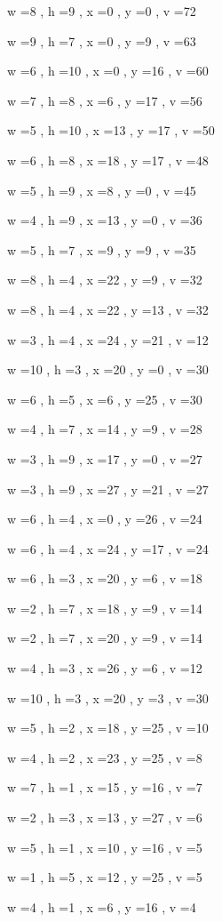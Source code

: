 \documentclass[11pt]{article}
\begin{document}
w =8 , h =9 , x =0 , y =0 , v =72
\par
w =9 , h =7 , x =0 , y =9 , v =63
\par
w =6 , h =10 , x =0 , y =16 , v =60
\par
w =7 , h =8 , x =6 , y =17 , v =56
\par
w =5 , h =10 , x =13 , y =17 , v =50
\par
w =6 , h =8 , x =18 , y =17 , v =48
\par
w =5 , h =9 , x =8 , y =0 , v =45
\par
w =4 , h =9 , x =13 , y =0 , v =36
\par
w =5 , h =7 , x =9 , y =9 , v =35
\par
w =8 , h =4 , x =22 , y =9 , v =32
\par
w =8 , h =4 , x =22 , y =13 , v =32
\par
w =3 , h =4 , x =24 , y =21 , v =12
\par
w =10 , h =3 , x =20 , y =0 , v =30
\par
w =6 , h =5 , x =6 , y =25 , v =30
\par
w =4 , h =7 , x =14 , y =9 , v =28
\par
w =3 , h =9 , x =17 , y =0 , v =27
\par
w =3 , h =9 , x =27 , y =21 , v =27
\par
w =6 , h =4 , x =0 , y =26 , v =24
\par
w =6 , h =4 , x =24 , y =17 , v =24
\par
w =6 , h =3 , x =20 , y =6 , v =18
\par
w =2 , h =7 , x =18 , y =9 , v =14
\par
w =2 , h =7 , x =20 , y =9 , v =14
\par
w =4 , h =3 , x =26 , y =6 , v =12
\par
w =10 , h =3 , x =20 , y =3 , v =30
\par
w =5 , h =2 , x =18 , y =25 , v =10
\par
w =4 , h =2 , x =23 , y =25 , v =8
\par
w =7 , h =1 , x =15 , y =16 , v =7
\par
w =2 , h =3 , x =13 , y =27 , v =6
\par
w =5 , h =1 , x =10 , y =16 , v =5
\par
w =1 , h =5 , x =12 , y =25 , v =5
\par
w =4 , h =1 , x =6 , y =16 , v =4
\par
\newpage


\end{document}
